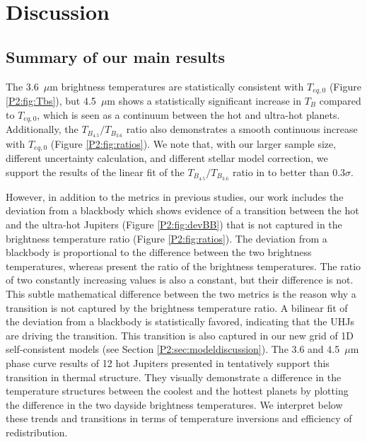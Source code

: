 
\section{Discussion}
\label{P2:sec:disc}

\subsection{Summary of our main results}

The 3.6~$\mu$m brightness temperatures are statistically consistent with $T_{eq,\textit{0}}$ (Figure \ref{P2:fig:Tbs}), but 4.5~$\mu$m shows a statistically significant increase in $T_B$ compared to $T_{eq,\textit{0}}$, which is seen as a continuum between the hot and ultra-hot planets.
Additionally, the $T_{B_{4.5}}/T_{B_{3.6}}$ ratio also demonstrates a smooth continuous increase with $T_{eq,\textit{0}}$ (Figure \ref{P2:fig:ratios}).
We note that, with our larger sample size, different uncertainty calculation, and different stellar model correction, we support the results of the linear fit of the $T_{B_{4.5}}/T_{B_{3.6}}$ ratio in \citet{Garhart2020} to better than $0.3\sigma$.

However, in addition to the metrics in previous studies, our work includes the deviation from a blackbody which shows evidence of a transition between the hot and the ultra-hot Jupiters (Figure \ref{P2:fig:devBB}) that is not captured in the brightness temperature ratio (Figure \ref{P2:fig:ratios}). The deviation from a blackbody is proportional to the difference between the two brightness temperatures, whereas \citet{Garhart2020} present the ratio of the brightness temperatures. The ratio of two constantly increasing values is also a constant, but their difference is not. This subtle mathematical difference between the two metrics is the reason why a transition is not captured by the brightness temperature ratio.
A bilinear fit of the deviation from a blackbody is statistically favored, indicating that the  UHJs are driving the transition. This transition is also captured in our new grid of  1D self-consistent models (see Section \ref{P2:sec:modeldiscussion}). The 3.6 and 4.5~$\mu$m phase curve results of 12 hot Jupiters presented in \citet{Keating2019} tentatively support this transition in thermal structure. They visually demonstrate a difference in the temperature structures between the coolest and the hottest planets by plotting the difference in the two dayside brightness temperatures. %
We interpret below these trends and transitions in terms of temperature inversions and efficiency of redistribution.

